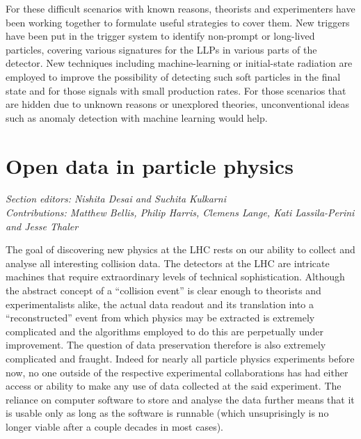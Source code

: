 \documentclass[10pt]{article}
\begin{document}
For these difficult scenarios with known reasons, theorists and experimenters have been working together to formulate useful strategies to cover them. New triggers have been put in the trigger system to identify non-prompt or long-lived particles, covering various signatures for the LLPs in various parts of the detector. New techniques including 
machine-learning or initial-state radiation are employed to improve the possibility of detecting such soft particles in the final state and for 
those signals with small production rates.
%
For those scenarios that are hidden due to unknown reasons or unexplored theories, unconventional ideas such as anomaly detection with machine learning would help.


\section{Open data in particle physics}
%
{\it\small Section editors: Nishita Desai and Suchita Kulkarni\\
%
Contributions: Matthew Bellis, Philip Harris, Clemens Lange, Kati Lassila-Perini and Jesse Thaler}

\medskip\noindent
The goal of discovering new physics at the LHC rests on our ability to collect and analyse all interesting collision data.  The detectors at the LHC are intricate machines that require extraordinary levels of technical sophistication.  Although the abstract concept of a ``collision event'' is clear enough to theorists and experimentalists alike, the actual data readout and its translation into a ``reconstructed'' event from which physics may be extracted is extremely complicated and the algorithms employed to do this are perpetually under improvement.  The question of data preservation therefore is also extremely complicated and fraught.  Indeed for nearly all particle physics experiments before now, no one outside of the respective experimental collaborations has had either access or ability to make any use of data collected at the said experiment.  The reliance on computer software to store and analyse the data further means that it is usable only as long as the software is runnable (which unsuprisingly is no longer viable after a couple decades in most cases).  
\end{document}
